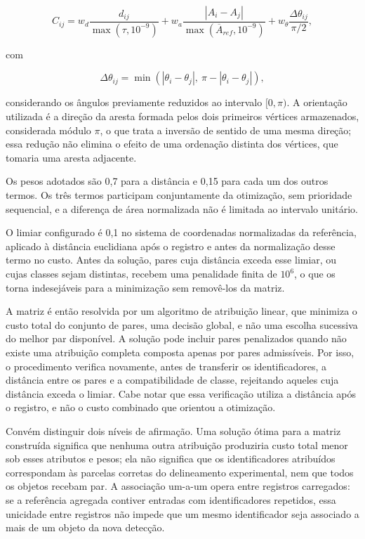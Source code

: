 \begin{equation}
  C_{ij} = w_d \frac{d_{ij}}{\max(\tau, 10^{-9})} + w_a \frac{|A_i - A_j|}{\max(\overline{A}_{ref}, 10^{-9})} + w_\theta \frac{\Delta\theta_{ij}}{\pi/2},
  \label{eq:custo-associacao}
\end{equation}

com

\begin{equation}
  \Delta\theta_{ij} = \min\left(|\theta_i - \theta_j|,\ \pi - |\theta_i - \theta_j|\right),
  \label{eq:delta-theta}
\end{equation}

considerando os \^angulos previamente reduzidos ao intervalo $[0,\pi)$. A orienta\c{c}\~ao utilizada \'e a dire\c{c}\~ao da aresta formada pelos dois primeiros v\'ertices armazenados, considerada m\'odulo $\pi$, o que trata a invers\~ao de sentido de uma mesma dire\c{c}\~ao; essa redu\c{c}\~ao n\~ao elimina o efeito de uma ordena\c{c}\~ao distinta dos v\'ertices, que tomaria uma aresta adjacente.

Os pesos adotados s\~ao 0,7 para a dist\^ancia e 0,15 para cada um dos outros termos. Os tr\^es termos participam conjuntamente da otimiza\c{c}\~ao, sem prioridade sequencial, e a diferen\c{c}a de \'area normalizada n\~ao \'e limitada ao intervalo unit\'ario.

O limiar configurado \'e 0,1 no sistema de coordenadas normalizadas da refer\^encia, aplicado \`a dist\^ancia euclidiana ap\'os o registro e antes da normaliza\c{c}\~ao desse termo no custo. Antes da solu\c{c}\~ao, pares cuja dist\^ancia exceda esse limiar, ou cujas classes sejam distintas, recebem uma penalidade finita de $10^6$, o que os torna indesej\'aveis para a minimiza\c{c}\~ao sem remov\^e-los da matriz.

A matriz \'e ent\~ao resolvida por um algoritmo de atribui\c{c}\~ao linear, que minimiza o custo total do conjunto de pares, uma decis\~ao global, e n\~ao uma escolha sucessiva do melhor par dispon\'ivel. A solu\c{c}\~ao pode incluir pares penalizados quando n\~ao existe uma atribui\c{c}\~ao completa composta apenas por pares admiss\'iveis. Por isso, o procedimento verifica novamente, antes de transferir os identificadores, a dist\^ancia entre os pares e a compatibilidade de classe, rejeitando aqueles cuja dist\^ancia exceda o limiar. Cabe notar que essa verifica\c{c}\~ao utiliza a dist\^ancia ap\'os o registro, e n\~ao o custo combinado que orientou a otimiza\c{c}\~ao.

Conv\'em distinguir dois n\'iveis de afirma\c{c}\~ao. Uma solu\c{c}\~ao \'otima para a matriz constru\'ida significa que nenhuma outra atribui\c{c}\~ao produziria custo total menor sob esses atributos e pesos; ela n\~ao significa que os identificadores atribu\'idos correspondam \`as parcelas corretas do delineamento experimental, nem que todos os objetos recebam par. A associa\c{c}\~ao um-a-um opera entre registros carregados: se a refer\^encia agregada contiver entradas com identificadores repetidos, essa unicidade entre registros n\~ao impede que um mesmo identificador seja associado a mais de um objeto da nova detec\c{c}\~ao.


